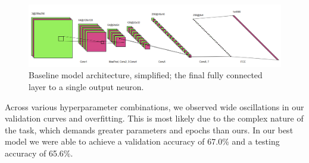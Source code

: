 \documentclass{article} %
\begin{document}
\begin{figure}[h]
    \begin{center}
        \includegraphics[scale=0.45]{figs/baseline.png}
    \end{center}
    \caption{Baseline model architecture, simplified; the final fully connected layer to a single output neuron.}
    \label{fig:baseline_arch}
\end{figure}

Across various hyperparameter combinations, we observed wide oscillations in our validation curves and overfitting. This is most likely due to the complex nature of the task, which demands greater parameters and epochs than ours. In our best model we were able to achieve a validation accuracy of 67.0\% and a testing accuracy of 65.6\%.

\end{document}
